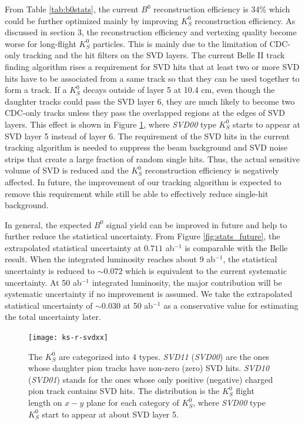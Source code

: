 From Table \ref{tab:b0stats}, the current $B^0$ reconstruction efficiency is 34\% which could be further optimized mainly by improving $K_S^0$ reconstruction efficiency. As discussed in section 3, the reconstruction efficiency and vertexing quality become worse for long-flight $K_S^0$ particles. This is mainly due to the limitation of CDC-only tracking and the hit filters on the SVD layers. The current Belle II track finding algorithm rises a requirement for SVD hits that at least two or more SVD hits have to be associated from a same track so that they can be used together to form a track. If a $K_S^0$ decays outside of layer 5 at 10.4 cm, even though the daughter tracks could pass the SVD layer 6, they are much likely to become two CDC-only tracks unless they pass the overlapped regions at the edges of SVD layers. 
This effect is shown in Figure \ref{fig:svd-r-xx}, where \textit{SVD00} type $K_S^0$ starts to appear at SVD layer 5 instead of layer 6. The requirement of the SVD hits in the current tracking algorithm is needed to suppress the beam background and SVD noise strips that create a large fraction of random single hits. Thus, the actual sensitive volume of SVD is reduced and the $K_S^0$ reconstruction efficiency is negatively affected. 
In future, the improvement of our tracking algorithm is expected to remove this requirement while still be able to effectively reduce single-hit background. 



In general, the expected $B^0$ signal yield can be improved in future and help to further reduce the statistical uncertainty. From Figure \ref{fig:stats_future}, the extrapolated statistical uncertainty at $0.711$ ab$^{-1}$ is comparable with the Belle result. 
When the integrated luminosity reaches about 9 ab$^{-1}$, the statistical uncertainty is reduced to $\sim 0.072$ which is equivalent to the current systematic uncertainty. At 50 ab$^{-1}$ integrated luminosity, the major contribution will be systematic uncertainty if no improvement is assumed. We take the extrapolated statistical uncertainty of $\sim 0.030$ at 50 ab$^{-1}$ as a conservative value for estimating the total uncertainty later.



\begin{figure}[htpb]
	\centering
	\texttt{[image: ks-r-svdxx]}
	\caption{The $K_S^0$ are categorized into 4 types. \textit{SVD11} (\textit{SVD00}) are the ones whose daughter pion tracks have non-zero (zero) SVD hits. \textit{SVD10} (\textit{SVD01}) stands for the ones whose only positive (negative) charged pion track contains SVD hits.
		 The distribution is the $K_S^0$ flight length on $x-y$ plane for each category of $K_S^0$, where \textit{SVD00} type $K_S^0$ start to appear at about SVD layer 5.}
	\label{fig:svd-r-xx}
\end{figure}

